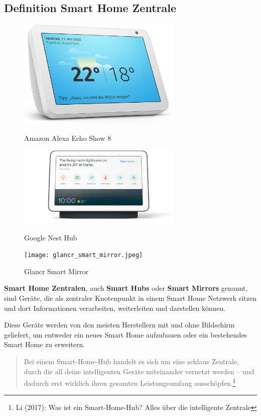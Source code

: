 \documentclass[12pt,a4paper]{article}
\begin{document}
 	\subsection{Definition Smart Home Zentrale}
 	\begin{figure}[htb]
 		\centering
 		\begin{minipage}[t]{0.3\linewidth}
 			\centering
 			\includegraphics[width=0.7\textwidth]{alexa_echo_show8.jpg}
 			\caption[Amazon Alexa Echo Show 8]{Amazon Alexa Echo Show 8}
 			\label{fig:alexa-echo-show8}
 		\end{minipage}
 		\hfill
 		\begin{minipage}[t]{0.3\linewidth}
 			\centering
 			\includegraphics[width=0.7\textwidth]{google_nest_hub.png}
 			\caption[Google Nest Hub]{Google Nest Hub}
 			\label{fig:google-nest-hub}
 		\end{minipage}
 		\hfill
 		\begin{minipage}[t]{0.3\linewidth}
 			\centering
 			\texttt{[image: glancr\_smart\_mirror.jpeg]}
 			\caption[Glancr Smart Mirror]{Glancr Smart Mirror}
 			\label{fig:glancr-smart-mirror}
 		\end{minipage}
 	\end{figure}
 	\textbf{Smart Home Zentralen}, auch \textbf{Smart Hubs} oder \textbf{Smart Mirrors} genannt, sind Geräte, die als zentraler Knotenpunkt in einem Smart Home Netzwerk sitzen und dort Informationen verarbeiten, weiterleiten und darstellen können.\par
 	Diese Geräte werden von den meisten Herstellern mit und ohne Bildschirm geliefert, um entweder ein neues Smart Home aufzubauen oder ein bestehendes Smart Home zu erweitern. 
 	\begin{quote}
 	\color{quotetext}
 		Bei einem Smart-Home-Hub handelt es sich um eine schlaue Zentrale, durch die all deine intelligenten Geräte miteinander vernetzt werden – und dadurch erst wirklich ihren gesamten Leistungsumfang ausschöpfen.\footnote{Li (2017): Was ist ein Smart-Home-Hub? Alles über die intelligente Zentrale}
 	\end{quote}
 	
\end{document}
